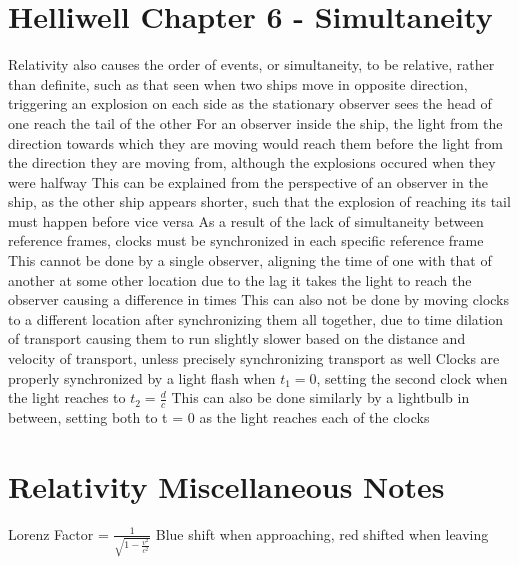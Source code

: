 \documentclass[11 pt, twoside]{article}
\newenvironment{outline*}
{
	\begin{outline}[enumerate]
	}
	{\end{outline}
}
\begin{document}
\section{Helliwell Chapter 6 - Simultaneity}
\begin{outline*}
\1 Relativity also causes the order of events, or simultaneity, to be relative, rather than definite, such as that seen when two ships move in opposite direction, triggering an explosion on each side as the stationary observer sees the head of one reach the tail of the other
\2 For an observer inside the ship, the light from the direction towards which they are moving would reach them before the light from the direction they are moving from, although the explosions occured when they were halfway
\2 This can be explained from the perspective of an observer in the ship, as the other ship appears shorter, such that the explosion of reaching its tail must happen before vice versa
\1 As a result of the lack of simultaneity between reference frames, clocks must be synchronized in each specific reference frame
\2 This cannot be done by a single observer, aligning the time of one with that of another at some other location due to the lag it takes the light to reach the observer causing a difference in times
\2 This can also not be done by moving clocks to a different location after synchronizing them all together, due to time dilation of transport causing them to run slightly slower based on the distance and velocity of transport, unless precisely synchronizing transport as well
\2 Clocks are properly synchronized by a light flash when $t_1 = 0$, setting the second clock when the light reaches to $t_2 = \frac{d}{c}$
\3 This can also be done similarly by a lightbulb in between, setting both to t = 0 as the light reaches each of the clocks
\end{outline*}
\section{Relativity Miscellaneous Notes}
Lorenz Factor = $\frac{1}{\sqrt{1 - \frac{v^2}{c^2}}}$
Blue shift when approaching, red shifted when leaving
\end{document}

